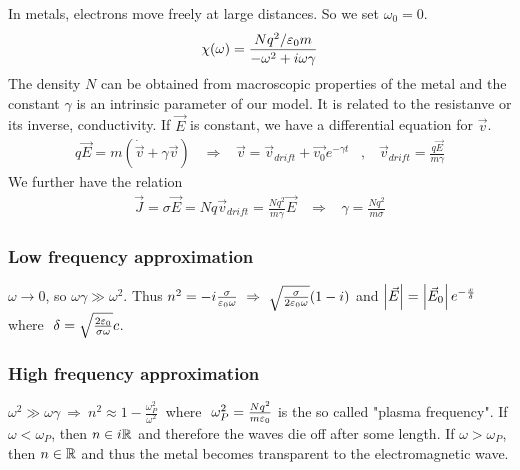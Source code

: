 In metals, electrons move freely at large distances. So we set $\omega_0 = 0$.
\begin{align*}
    \chi(\omega) = \frac{N q^2 / \varepsilon_0 m}{- \omega^2 + i \omega \gamma}
\end{align*}
The density $N$ can be obtained from macroscopic properties of the metal and
the constant $\gamma$ is an intrinsic parameter of our model. It is related
to the resistanve or its inverse, conductivity. If $\vec{E}$ is constant,
we have a differential equation for $\vec{v}$.
\begin{align*}
    q \vec{E} = m (\dot{\vec{v}} + \gamma \vec{v})
    \hspace{10pt} \Rightarrow \hspace{10pt}
    \vec{v} = \vec{v}_{drift} + \vec{v_0} e^{-\gamma t}
    \hspace{10pt} , \hspace{10pt}
    \vec{v}_{drift} = \frac{q \vec{E}}{m \gamma}
\end{align*}
We further have the relation
\begin{align*}
    \vec{J} = \sigma \vec{E} = N q \vec{v}_{drift} = \frac{N q^2}{m \gamma} \vec{E}
    \hspace{10pt} \Rightarrow \hspace{10pt}
    \gamma = \frac{N q^2}{m \sigma} 
\end{align*}

\subsubsection{Low frequency approximation}

$\omega \rightarrow 0$, so $\omega \gamma \gg \omega^2$. Thus
$n^2 = -i \frac{\sigma}{\varepsilon_0 \omega} \ \Rightarrow \
\sqrt{\frac{\sigma}{2 \varepsilon_0 \omega}} (1-i)$ and
$\left\vert \vec{E} \right\vert = \left\vert \vec{E}_0 \right\vert e^{-\frac{x}{\delta}} \ $ where
$\ \delta = \sqrt{\frac{2 \epsilonnull}{\sigma \omega}} c$.

\subsubsection{High frequency approximation}

$\omega^2 \gg \omega \gamma \ \Rightarrow \ n^2 \approx 1 - \frac{\omega_P^2}{\omega^2} \ $
where $\ \omega_P^2 = \frac{N q^2}{m \varepsilon_0}$ is the so called "plasma
frequency". If $\omega < \omega_P$, then $n \in i \mathbb{R}$ and therefore the waves
die off after some length. If $\omega > \omega_P$, then $n \in \mathbb{R}$ and thus the
metal becomes transparent to the electromagnetic wave.

